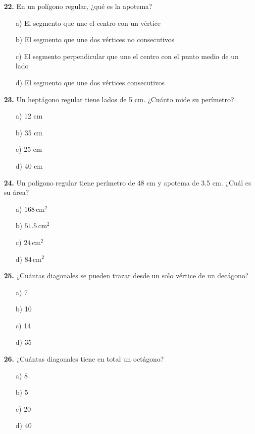 \noindent\textbf{22.} En un polígono regular, ¿qué es la apotema?

\begin{itemize}
    \item[a)] El segmento que une el centro con un vértice
    \item[b)] El segmento que une dos vértices no consecutivos
    \item[c)] El segmento perpendicular que une el centro con el punto medio de un lado
    \item[d)] El segmento que une dos vértices consecutivos
\end{itemize}


\noindent\textbf{23.} Un heptágono regular tiene lados de 5 cm. ¿Cuánto mide su perímetro?

\begin{itemize}
    \item[a)] 12 cm
    \item[b)] 35 cm
    \item[c)] 25 cm
    \item[d)] 40 cm
\end{itemize}


\noindent\textbf{24.} Un polígono regular tiene perímetro de 48 cm y apotema de 3.5 cm. ¿Cuál es su área?

\begin{itemize}
    \item[a)] $168\,\text{cm}^2$
    \item[b)] $51.5\,\text{cm}^2$
    \item[c)] $24\,\text{cm}^2$
    \item[d)] $84\,\text{cm}^2$
\end{itemize}


\noindent\textbf{25.} ¿Cuántas diagonales se pueden trazar desde un solo vértice de un decágono?

\begin{itemize}
    \item[a)] 7
    \item[b)] 10
    \item[c)] 14
    \item[d)] 35
\end{itemize}


\noindent\textbf{26.} ¿Cuántas diagonales tiene en total un octágono?

\begin{itemize}
    \item[a)] 8
    \item[b)] 5
    \item[c)] 20
    \item[d)] 40
\end{itemize}


